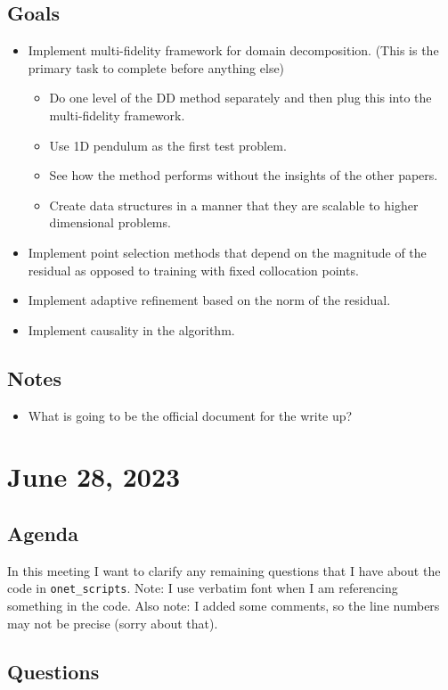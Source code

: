 \documentclass{article}
\begin{document}
\subsection*{Goals}
\begin{itemize}
\item Implement multi-fidelity framework for domain decomposition. (This is the primary task to complete before anything else)
\begin{itemize}
	\item Do one level of the DD method separately and then plug this into the multi-fidelity framework.
	\item Use 1D pendulum as the first test problem.
	\item See how the method performs without the insights of the other papers.
	\item Create data structures in a manner that they are scalable to higher dimensional problems.
\end{itemize}
\item Implement point selection methods that depend on the magnitude of the residual as opposed to training with fixed collocation points.
\item Implement adaptive refinement based on the norm of the residual.
\item Implement causality in the algorithm.
\end{itemize}
\subsection*{Notes}
\begin{itemize}
	\item What is going to be the official document for the write up?
\end{itemize}
\newpage
\section*{June 28, 2023}
\subsection*{Agenda}
In this meeting I want to clarify any remaining questions that I have about the code in \verb|onet_scripts|. Note: I use verbatim font when I am referencing something in the code. Also note: I added some comments, so the line numbers may not be precise (sorry about that).
\subsection*{Questions}
\end{document}
